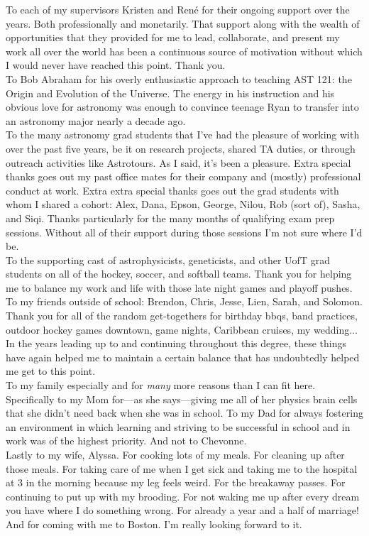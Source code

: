 To each of my supervisors Kristen and Ren\'e for their ongoing support over the
years. Both professionally and monetarily. That support along with the wealth
of opportunities that they provided for me to lead, collaborate, and
present my work all over the world has been a continuous source of motivation
without which I would never have reached this point. Thank you. \\

To Bob Abraham for his overly enthusiastic approach to teaching AST
121: the Origin and Evolution of the Universe. The energy in his instruction
and his obvious love for astronomy was enough to convince teenage Ryan to
transfer into an astronomy major nearly a decade ago.  \\

To the many astronomy grad students that I've had the pleasure of working with
over the past five years, be it on research projects, shared TA duties, or
through outreach activities like Astrotours. As I said, it's been a pleasure.
Extra special thanks goes out my past office mates for their company and
(mostly) professional conduct at work.
Extra extra special thanks goes out the grad students with whom I shared a
cohort: Alex, Dana, Epson,
George, Nilou, Rob (sort of), Sasha, and Siqi. Thanks particularly for the many months
of qualifying exam prep sessions. Without all of their support during those
sessions I'm not sure where I'd be. \\

To the supporting cast of
astrophysicists, geneticists, and other UofT grad students on all of the
hockey, soccer, and softball teams. Thank you for helping me to balance my work
and life with those late night games and playoff pushes. \\

To my friends outside of school: Brendon, Chris, Jesse, Lien, Sarah, and
Solomon.
Thank you for all of the random get-togethers for birthday bbqs, band practices,
outdoor hockey games downtown, game nights, Caribbean cruises, my wedding... 
In the years leading up to and continuing throughout this degree, these things
have again helped me to maintain a certain balance that has undoubtedly helped
me get to this point. \\

To my family especially and for \emph{many} more reasons than I can fit here. 
Specifically to my Mom for---as she says---giving me all of her physics
brain cells that she didn't need back when she was in school. To my Dad for
always fostering an environment in which learning and striving to be
successful in school and in work was of the highest priority. And not to
Chevonne. \\

Lastly to my wife, Alyssa. For cooking lots of my meals. For cleaning up after those
meals. For taking care of me when I get sick and taking me to the hospital at 3
in the morning because my leg feels weird. For the breakaway passes.
For continuing to put up with my brooding. For not waking me up after every
dream you have where I do something wrong. For already a year and a half of
marriage! And for coming with me to Boston. I'm really looking forward to it.
